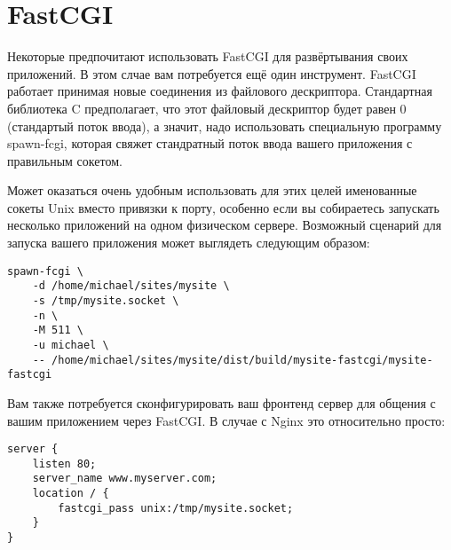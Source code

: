 \section{FastCGI}
%
%
Некоторые предпочитают использовать FastCGI для развёртывания своих приложений. В этом слчае вам потребуется ещё один инструмент. FastCGI работает принимая новые соединения из файлового дескриптора. Стандартная библиотека C предполагает, что этот файловый дескриптор будет равен 0 (стандартый поток ввода), а значит, надо использовать специальную программу spawn-fcgi, которая свяжет стандратный поток ввода вашего приложения с правильным сокетом.

Может оказаться очень удобным использовать для этих целей именованные сокеты Unix вместо привязки к порту, особенно если вы собираетесь запускать несколько приложений на одном физическом сервере. Возможный сценарий для запуска вашего приложения может выглядеть следующим образом:

\begin{lstlisting}
spawn-fcgi \
    -d /home/michael/sites/mysite \
    -s /tmp/mysite.socket \
    -n \
    -M 511 \
    -u michael \
    -- /home/michael/sites/mysite/dist/build/mysite-fastcgi/mysite-fastcgi
\end{lstlisting}
%

Вам также потребуется сконфигурировать ваш фронтенд сервер для общения с вашим приложением через FastCGI. В случае с Nginx это относительно просто:
%
\begin{lstlisting}
server {
    listen 80;
    server_name www.myserver.com;
    location / {
        fastcgi_pass unix:/tmp/mysite.socket;
    }
}
\end{lstlisting}
%

